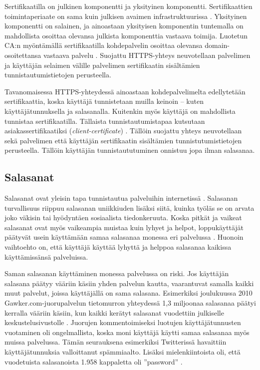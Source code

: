 \documentclass{tktltiki}
\begin{document}
Sertifikaatilla on julkinen komponentti ja yksityinen komponentti. 
Sertifikaattien toimintaperiaate on sama kuin julkisen avaimen infrastruktuurissa \cite{nist_pki_intro, henry_story_foaf_ssl}.
Yksityinen komponentti on salainen, ja ainoastaan yksityisen komponentin tuntemalla on mahdollista osoittaa olevansa julkista komponenttia vastaava toimija. Luotetun CA:n myöntämällä sertifikaatilla kohdepalvelin osoittaa olevansa domain-osoitettansa vastaava palvelu \cite{authenticated_names}.
Suojattu HTTPS-yhteys neuvotellaan palvelimen ja käyttäjän selaimen välille palvelimen sertifikaatin sisältämien tunnistautumistietojen perusteella.

Tavanomaisessa HTTPS-yhteydessä ainoastaan kohdepalvelimelta edellytetään sertifikaattia, koska käyttäjä tunnistetaan muilla keinoin -- kuten käyttäjätunnuksella ja salasanalla. 
Kuitenkin myös käyttäjä on mahdollista tunnistaa sertifikaatilla. Tällaista tunnistautumistapaa kutsutaan asiakassertifikaatiksi (\emph{client-certificate}) \cite{henry_story_foaf_ssl}.
Tällöin suojattu yhteys neuvotellaan sekä palvelimen että käyttäjän sertifikaatin sisältämien tunnistutumistietojen perusteella. 
Tällöin käyttäjän tunnistaututuminen onnistuu jopa ilman salasanaa.


\subsection{Salasanat}
 \label{sec:passwords}
 
Salasanat ovat yleisin tapa tunnistautua palveluihin internetissä \cite{study_of_passwords_07, passpet_06, password_management_strategies_06, pwdhash_extension_05}.
Salasanan turvallisuus riippuu salasanan uniikkiuden lisäksi siitä, kuinka työläs se on arvata joko väkisin tai hyödyntäen sosiaalista tiedonkeruuta. Koska pitkät ja vaikeat salasanat ovat myös vaikeampia muistaa kuin lyhyet ja helpot, loppukäyttäjät päätyvät usein käyttämään samaa salasanaa monessa eri palvelussa \cite{study_of_passwords_07}. Huonoin vaihtoehto on, että käyttäjä käyttää lyhyttä ja helppoa salasanaa kaikissa käyttämissänsä palveluissa.

Saman salasanan käyttäminen monessa palvelussa on riski. Jos käyttäjän salasana päätyy vääriin käsiin yhden palvelun kautta, vaarantuvat samalla kaikki muut palvelut, joissa käyttäjällä on sama salasana. Esimerkiksi joulukuussa 2010 Gawker.com-juorupalvelun tietomurron yhteydessä 1,3 miljoonaa salasanaa päätyi kerralla vääriin käsiin, kun kaikki kerätyt salasanat vuodettiin julkiselle keskustelusivustolle \cite{bbc_gawker_12_2010, forbes_gawker_12_2010}. Juorujen kommentoimiseksi luotujen käyttäjätunnusten vuotaminen oli ongelmallista, koska moni käyttäjä käytti samaa salasanaa myös muissa palvelussa. Tämän seurauksena esimerkiksi Twitterissä havaittiin käyttäjätunnuksia valloittanut spämmiaalto. Lisäksi mielenkiintoista oli, että vuodetuista salasanoista 1.958 kappaletta oli ''password'' \cite{forbes_gawker_12_2010}. 
\end{document}
